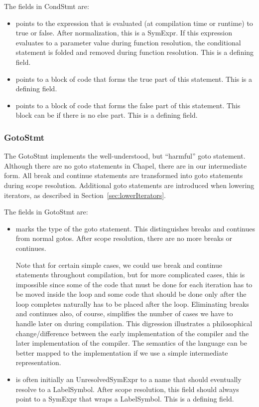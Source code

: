 \documentclass[10pt]{article}
\begin{document}
The fields in CondStmt are:
\begin{itemize}
\item {} points to the expression that is evaluated
  (at compilation time or runtime) to true or false.  After
  normalization, this is a SymExpr.  If this expression evaluates to a
  parameter value during function resolution, the conditional
  statement is folded and removed during function resolution.
  This is a defining field.
\item {} points to a block of code that forms
  the true part of this statement.
  This is a defining field.
\item {} points to a block of code that forms
  the false part of this statement.  This block can be  if
  there is no else part.
  This is a defining field.
\end{itemize}

\subsubsection{GotoStmt}
\label{sec:gotostmt}

The GotoStmt implements the well-understood, but ``harmful'' goto
statement.  Although there are no goto statements in Chapel, there are
in our intermediate form.  All break and continue statements are
transformed into goto statements during scope resolution.  Additional
goto statements are introduced when lowering iterators, as described in
Section~\ref{sec:lowerIterators}.

The fields in GotoStmt are:
\begin{itemize}
\item {} marks the type of the goto statement.  This
  distinguishes breaks and continues from normal gotos.  After scope
  resolution, there are no more breaks or continues.

  Note that for
  certain simple cases, we could use break and continue statements
  throughout compilation, but for more complicated cases, this is
  impossible since some of the code that must be done for each
  iteration has to be moved inside the loop and some code that should
  be done only after the loop completes naturally has to be placed
  after the loop.  Eliminating breaks and continues also, of course,
  simplifies the number of cases we have to handle later on during
  compilation.  This digression illustrates a philosophical
  change/difference between the early implementation of the compiler
  and the later implementation of the compiler.  The semantics of the
  language can be better mapped to the implementation if we use a
  simple intermediate representation.
\item {} is often initially an UnresolvedSymExpr to a
  name that should eventually resolve to a LabelSymbol.  After scope
  resolution, this field should always point to a SymExpr that wraps a
  LabelSymbol.
  This is a defining field.
\end{itemize}
\end{document}
